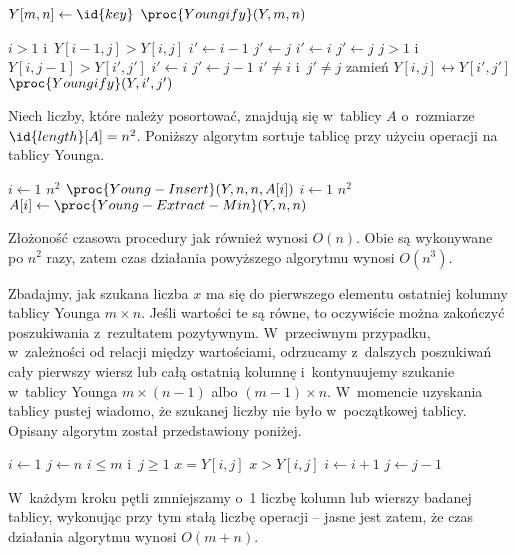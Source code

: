 \begin{codebox}
\li	$Y[m,n]\gets\id{key}$
\li $\proc{Youngify}(Y,m,n)$
\end{codebox}

\begin{codebox}
\li	\If $i>1$ i~$Y[i-1,j]>Y[i,j]$
\li		\Then
			$i'\gets i-1$
\li			$j'\gets j$
\li		\Else
			$i'\gets i$
\li			$j'\gets j$
		\End
\li	\If $j>1$ i~$Y[i,j-1]>Y[i',j']$
\li		\Then
			$i'\gets i$
\li			$j'\gets j-1$
		\End
\li	\If $i'\ne i$ i~$j'\ne j$
\li		\Then
			zamień $Y[i,j]\leftrightarrow Y[i',j']$
\li			$\proc{Youngify}(Y,i',j')$
		\End
\end{codebox}

\subproblem %
Niech liczby, które należy posortować, znajdują się w~tablicy $A$ o~rozmiarze $\id{length}[A]=n^2$. Poniższy algorytm sortuje tablicę przy użyciu operacji na tablicy Younga.
\begin{codebox}
\li	\For $i\gets1$ \To $n^2$
\li		\Do $\proc{Young-Insert}(Y,n,n,A[i])$
		\End
\li	\For $i\gets1$ \To $n^2$
\li		\Do $A[i]\gets\proc{Young-Extract-Min}(Y,n,n)$
		\End
\end{codebox}
Złożoność czasowa procedury  jak również  wynosi $O(n)$. Obie są wykonywane po $n^2$ razy, zatem czas działania powyższego algorytmu wynosi $O(n^3)$.

\subproblem %
Zbadajmy, jak szukana liczba $x$ ma się do pierwszego elementu ostatniej kolumny tablicy Younga $m\times n$. Jeśli wartości te są równe, to oczywiście można zakończyć poszukiwania z~rezultatem pozytywnym. W~przeciwnym przypadku, w~zależności od relacji między wartościami, odrzucamy z~dalszych poszukiwań cały pierwszy wiersz lub całą ostatnią kolumnę i~kontynuujemy szukanie w~tablicy Younga $m\times(n-1)$ albo $(m-1)\times n$. W~momencie uzyskania tablicy pustej wiadomo, że szukanej liczby nie było w~początkowej tablicy. Opisany algorytm został przedstawiony poniżej.
\begin{codebox}
\li	$i\gets1$
\li	$j\gets n$
\li	\While $i\le m$ i~$j\ge1$
\li		\Do
			\If $x=Y[i,j]$
\li				\Then \Return {}
\li			\ElseIf $x>Y[i,j]$
\li				\Then $i\gets i+1$
\li			\ElseNoIf $j\gets j-1$
				\End
		\End
\li	\Return {}
\end{codebox}
W~każdym kroku pętli  zmniejszamy o~1 liczbę kolumn lub wierszy badanej tablicy, wykonując przy tym stałą liczbę operacji -- jasne jest zatem, że czas działania algorytmu wynosi $O(m+n)$.

\endinput
